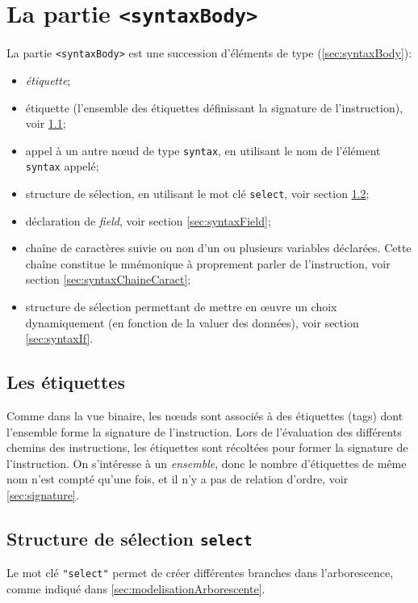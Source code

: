\section{La partie \texttt{<syntaxBody>}}

La partie \texttt{<syntaxBody>} est une succession d'éléments de type (\ref{sec:syntaxBody}):
\begin{itemize}
\item \emph{étiquette};
\item étiquette (l'ensemble des étiquettes définissant la signature de l'instruction), voir \ref{sec:syntaxEtiquette};
\item appel à un autre nœud de type \texttt{syntax}, en utilisant le nom de l'élément \texttt{syntax} appelé;
\item structure de sélection, en utilisant le mot clé \texttt{select}, voir section \ref{sec:syntaxSelect};
\item déclaration de \emph{field}, voir section \ref{sec:syntaxField};
\item chaîne de caractères suivie ou non d'un ou plusieurs variables déclarées. Cette chaîne constitue le mnémonique à proprement parler de l'instruction, voir section \ref{sec:syntaxChaineCaract};
\item structure de sélection permettant de mettre en œuvre un choix dynamiquement (en fonction de la valuer des données), voir section \ref{sec:syntaxIf}.
\end{itemize}

\subsection{Les étiquettes}
\label{sec:syntaxEtiquette}
Comme dans la vue binaire, les nœuds sont associés à des étiquettes (tags) dont l'ensemble forme la signature de l'instruction. Lors de l'évaluation des différents chemins des instructions, les étiquettes sont récoltées pour former la signature de l'instruction. On s'intéresse à un \emph{ensemble}, donc le nombre d'étiquettes de même nom n'est compté qu'une fois, et il n'y a pas de relation d'ordre, voir \ref{sec:signature}.

\subsection{Structure de sélection \texttt{select}}
\label{sec:syntaxSelect}
Le mot clé {\tt "select"} permet de créer différentes branches dans l'arborescence, comme indiqué dans \ref{sec:modelisationArborescente}.

